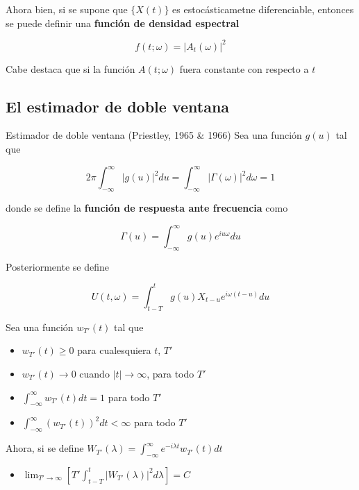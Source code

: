 Ahora bien, si se supone que $\{X(t)\}$ es estoc\'asticametne diferenciable, entonces
se puede definir una \textbf{funci\'on de densidad espectral}

\begin{equation*}
f(t;\omega) = \lvert A_t(\omega) \lvert^{2}
\end{equation*}

Cabe destaca que si la funci\'on $A(t;\omega)$ fuera constante con respecto a $t$

\subsection{El estimador de doble ventana}

{Estimador de doble ventana (Priestley, 1965 \& 1966)}
Sea una funci\'on $g(u)$ tal que

\begin{equation*}
2\pi \int_{-\infty}^{\infty} \lvert g(u) \lvert^{2} du 
= 
\int_{-\infty}^{\infty} \lvert \Gamma(\omega) \lvert^{2} d\omega
= 1
\end{equation*}

donde se define la \textbf{funci\'on de respuesta ante frecuencia} como

\begin{equation*}
\Gamma(u) = \int_{-\infty}^{\infty} g(u) e^{i u \omega} du
\end{equation*}

Posteriormente se define 

\begin{equation*}
U(t,\omega) = \int_{t-T}^{t} g(u) X_{t-u} e^{i \omega (t-u)} du
\end{equation*}


Sea una funci\'on $w_{T'}(t)$ tal que
\begin{itemize}
\item $w_{T'}(t) \geq 0$ para cualesquiera $t$, $T'$
\item $w_{T'}(t) \rightarrow 0$ cuando $\lvert t \lvert \rightarrow \infty$, para todo $T'$
\item $\displaystyle \int_{-\infty}^{\infty} w_{T'}(t) dt = 1$ para todo $T'$
\item $\displaystyle \int_{-\infty}^{\infty} \left( w_{T'}(t) \right)^{2} dt < \infty$ para todo $T'$
\end{itemize}

Ahora, si se define 
$\displaystyle W_{T'}(\lambda) = \int_{-\infty}^{\infty} e^{-i\lambda t}w_{T'}(t) dt $
\begin{itemize}
\item $\lim_{T'\rightarrow\infty} \left[ T' \int_{t-T}^{t} \lvert W_{T'}(\lambda) \lvert^{2} d\lambda \right] = C$
\end{itemize}


